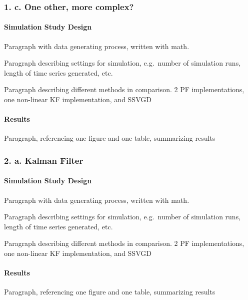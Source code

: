 \documentclass[]{article}
\let\oldparagraph\paragraph
\renewcommand{\paragraph}[1]{\oldparagraph{#1}\mbox{}}
\begin{document}
\subsubsection{1. c. One other, more
complex?}\label{c.-one-other-more-complex}

\paragraph{Simulation Study Design}\label{simulation-study-design-2}

Paragraph with data generating process, written with math.

Paragraph describing settings for simulation, e.g.~number of simulation
runs, length of time series generated, etc.

Paragraph describing different methods in comparison. 2 PF
implementations, one non-linear KF implementation, and SSVGD

\paragraph{Results}\label{results-2}

Paragraph, referencing one figure and one table, summarizing results

\subsubsection{2. a. Kalman Filter}\label{a.-kalman-filter}

\paragraph{Simulation Study Design}\label{simulation-study-design-3}

Paragraph with data generating process, written with math.

Paragraph describing settings for simulation, e.g.~number of simulation
runs, length of time series generated, etc.

Paragraph describing different methods in comparison. 2 PF
implementations, one non-linear KF implementation, and SSVGD

\paragraph{Results}\label{results-3}

Paragraph, referencing one figure and one table, summarizing results
\end{document}

